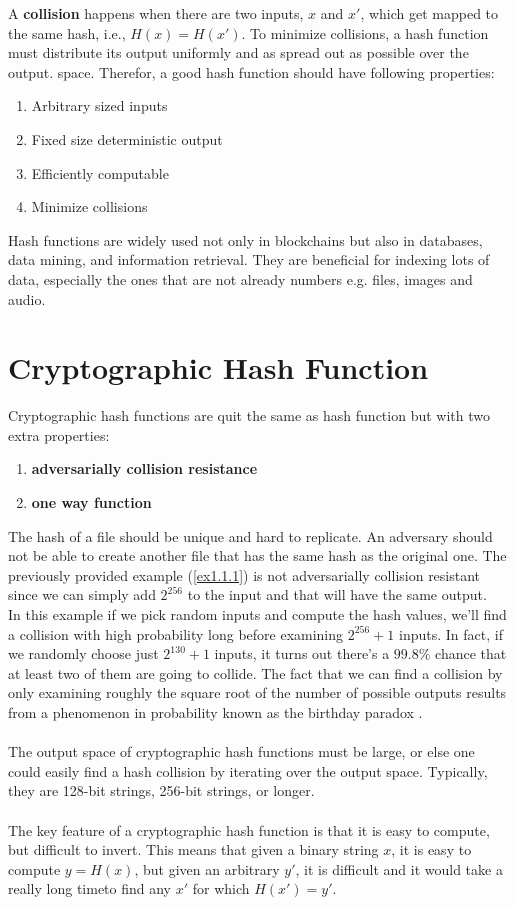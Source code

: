 \documentclass{report}
\begin{document}
A \textbf{collision} happens when there are two inputs, $x$ and $x'$, which get mapped to the same hash, i.e., $H(x) = H(x')$.
To minimize collisions, a hash function must distribute its output uniformly and as spread out as possible over the output. space. Therefor, a good hash function should have following properties:
\begin{enumerate}
	\item Arbitrary sized inputs
	\item Fixed size deterministic output
	\item Efficiently computable
	\item Minimize collisions
\end{enumerate}
Hash functions are widely used not only in blockchains but also in databases, data mining, and information retrieval. They are beneficial for indexing lots of data, especially the ones that are not already numbers e.g. files, images and audio.
\section{Cryptographic Hash Function}
Cryptographic hash functions are quit the same as hash function but with two extra properties:
\begin{enumerate}
	\item \textbf{adversarially collision resistance}
	\item \textbf{one way function}
\end{enumerate} 
The hash of a file should be unique and hard to replicate. An adversary should not be able to create another file that has the same hash as the original one. The previously provided example (\ref{ex1.1.1}) is not adversarially collision resistant since we can simply add $2^{256}$ to the input and that will have the same output.\\
In this example if we pick random inputs and compute the hash values, we’ll find a collision with high probability long before examining $2^{256} + 1$ inputs. In fact, if we randomly choose just $2^{130} + 1$ inputs, it turns out there’s a $99.8\%$ chance that at least two of them are going to collide. The fact that we can find a collision by only examining roughly the square root of the number of possible outputs results from a phenomenon in probability known as the birthday
paradox .\\\\
The output space of cryptographic hash functions must be large, or else one could easily find a hash collision by iterating over the output space. Typically, they are 128-bit strings, 256-bit strings, or longer.\\\\
The key feature of a cryptographic hash function is that it is easy to compute, but difficult to invert. This means that given a binary string $x$, it is easy to compute $y = H(x)$, but given an arbitrary $y'$, it is difficult and it would take a really long timeto find any $x'$ for which $H(x') = y'$.
\end{document}
